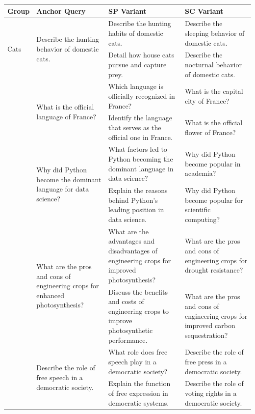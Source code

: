 \begin{table}[!htbp]
\centering
\small
\setlength{\tabcolsep}{4pt}
\begin{tabular}{p{1.75cm} p{2.25cm} p{4.25cm} p{4.25cm}}
\toprule
\textbf{Group} & \textbf{Anchor Query} & \textbf{SP Variant} & \textbf{SC Variant} \\
\midrule
\multirow{2}{*}{Cats} &
\multirow{2}{=}{Describe the hunting behavior of domestic cats.} &
Describe the hunting habits of domestic cats. &
Describe the sleeping behavior of domestic cats. \\
& & Detail how house cats pursue and capture prey. &
Describe the nocturnal behavior of domestic cats. \\
\addlinespace
\multirow{2}{*}{France} &
\multirow{2}{=}{What is the official language of France?} &
Which language is officially recognized in France? &
What is the capital city of France? \\
& & Identify the language that serves as the official one in France. &
What is the official flower of France? \\
\addlinespace
\multirow{2}{*}{Python} &
\multirow{2}{=}{Why did Python become the dominant language for data science?} &
What factors led to Python becoming the dominant language in data science? &
Why did Python become popular in academia? \\
& & Explain the reasons behind Python's leading position in data science. &
Why did Python become popular for scientific computing? \\
\addlinespace
\multirow{2}{*}{Photosynthesis} &
\multirow{2}{=}{What are the pros and cons of engineering crops for enhanced photosynthesis?} &
What are the advantages and disadvantages of engineering crops for improved photosynthesis? &
What are the pros and cons of engineering crops for drought resistance? \\
& & Discuss the benefits and costs of engineering crops to improve photosynthetic performance. &
What are the pros and cons of engineering crops for improved carbon sequestration? \\
\addlinespace
\multirow{2}{*}{Democracy} &
\multirow{2}{=}{Describe the role of free speech in a democratic society.} &
What role does free speech play in a democratic society? &
Describe the role of free press in a democratic society. \\
& & Explain the function of free expression in democratic systems. &
Describe the role of voting rights in a democratic society. \\

\end{tabular}
\end{table}
